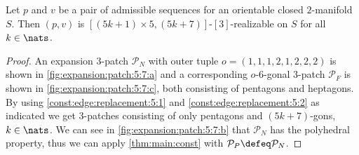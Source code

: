 \begin{theorem}
  Let $p$ and $v$ be a pair of admissible sequences for an orientable closed $2$-manifold $S$. Then $(p, v)$ is $[(5k + 1) \times 5, (5k+7)]$-$[3]$-realizable on $S$ for all $k \in \nats$.
  \begin{proof}
    An expansion $3$-patch $\mathcal{P}_N$ with outer tuple $o = (1, 1, 1, 2, 1, 2, 2, 2)$ is shown in \autoref{fig:expansion:patch:5:7:a} and a corresponding $o$-$6$-gonal $3$-patch $\mathcal{P}_F$ is shown in \autoref{fig:expansion:patch:5:7:c}, both consisting of pentagons and heptagons. By using \autoref{const:edge:replacement:5:1} and \autoref{const:edge:replacement:5:2} as indicated we get $3$-patches consisting of only pentagons and $(5k+7)$-gons, $k \in \nats$. We can see in \autoref{fig:expansion:patch:5:7:b} that $\mathcal{P}_N$ has the polyhedral property, thus we can apply \autoref{thm:main:const} with $\mathcal{P}_P \defeq \mathcal{P}_N$.
  \end{proof}%
\end{theorem}%

